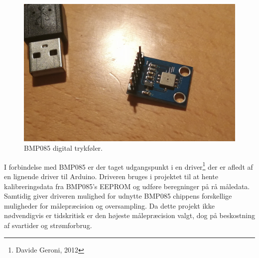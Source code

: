 \begin{figure}[h]
	\centering
	\includegraphics[width=0.7\linewidth]{figs/device_bmp.jpg}
	\caption{BMP085 digital trykføler.}
	\label{fig:devicebmp}
\end{figure}

I forbindelse med BMP085 er der taget udgangspunkt i en driver\footnote{Davide Geroni, 2012} der er afledt af en lignende driver til Arduino.
Driveren bruges i projektet til at hente kalibreringsdata fra BMP085's EEPROM og udføre beregninger på rå måledata. Samtidig giver driveren 
mulighed for udnytte BMP085 chippens forskellige muligheder for målepræcision og oversampling. Da dette projekt ikke nødvendigvis er tidskritisk er 
den højeste målepræcision valgt, dog på beskostning af svartider og strømforbrug.
